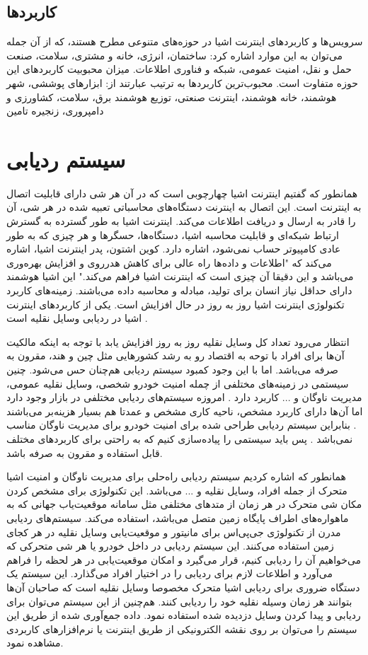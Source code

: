 \subsection{کاربردها}
سرویس‌ها و کاربردهای اینترنت اشیا در حوزه‌های متنوعی مطرح هستند، که از آن جمله می‌توان به این موارد اشاره کرد: ساختمان، انرژی، خانه و مشتری، سلامت، صنعت حمل و نقل، امنیت عمومی، شبكه و فناوری اطلاعات. میزان محبوبیت کاربردهای این حوزه متفاوت است. محبوب‌ترین کاربردها به ترتیب عبارتند از: ابزارهای پوششی، شهر هوشمند، خانه هوشمند، اینترنت صنعتی، توزیع هوشمند برق، سلامت، کشاورزی و دامپروری، زنجیره تامین
\section{سیستم ردیابی}
همانطور که گفتیم اینترنت اشیا چهارچوبی است که در آن هر شی دارای قابلیت اتصال به اینترنت است.
	این اتصال به اینترنت دستگاه‌های محاسباتی تعبیه شده در هر شی، آن را قادر به ارسال و دریافت اطلاعات می‌کند. اینترنت اشیا به طور گسترده به گسترش ارتباط شبکه‌ای و قابلیت محاسبه اشیا، دستگاه‌ها، حسگرها و هر چیزی که به طور عادی کامپیوتر حساب نمی‌شود، اشاره دارد. کوین اشتون، پدر اینترنت اشیا، اشاره می‌کند که "اطلاعات و داده‌ها راه عالی برای کاهش هدرروی و افزایش بهره‌وری می‌باشد و این دقیقا آن چیزی است که اینترنت اشیا فراهم می‌کند." این اشیا هوشمند دارای حداقل نیاز انسان برای تولید، مبادله و محاسبه داده می‌باشند. زمینه‌های کاربرد تکنولوژی اینترنت اشیا روز به روز در حال افزایش است. یکی از کاربردهای اینترنت اشیا در ردیابی وسایل نقلیه است \cite{Mangla2017, Mukhtar2015}.
	
انتظار می‌رود تعداد کل وسایل نقلیه روز به روز افزایش یابد با توجه به اینکه مالکیت آن‌ها برای افراد با توحه به اقتصاد رو به رشد کشورهایی مثل چین و هند، مقرون به صرفه می‌باشد. اما با این وجود کمبود سیستم ردیابی هم‌چنان حس می‌شود. چنین سیستمی در زمینه‌های مختلفی از چمله امنیت خودرو شخصی، وسایل نقلیه عمومی، مدیریت ناوگان و ... کاربرد دارد \cite{Pham2013}. امروزه سیستم‌های ردیابی مختلفی در بازار وجود دارد اما آن‌ها دارای کاربرد مشخص، ناحیه کاری مشخص و عمدتا هم بسیار هزینه‌بر می‌باشند \cite{YoujingCui2003}. بنابراین سیستم ردیابی طراحی شده برای امنیت خودرو برای مدیریت ناوگان مناسب نمی‌باشد \cite{Song2008}. پس باید سیستمی را پیاده‌سازی کنیم که به راحتی برای کاربردهای مختلف قابل استفاده و مقرون به صرفه باشد.


همانطور که اشاره کردیم سیستم ردیابی راه‌حلی برای مدیریت ناوگان و امنیت اشیا متحرک از جمله افراد، وسایل نقلیه و ... می‌باشد. این تکنولوژی برای مشخص کردن مکان شی متحرک در هر زمان از متدهای مختلفی مثل سامانه موقعیت‌یاب جهانی  که به ماهواره‌های اطراف پایگاه زمین متصل می‌باشد، استفاده می‌کند. سیستم‌های ردیابی مدرن از تکنولوژی جی‌پی‌اس برای مانیتور و موقعیت‌یابی وسایل نقلیه در هر کجای زمین استفاده می‌کنند. این سیستم ردیابی در داخل خودرو یا هر شی متحرکی که می‌خواهیم آن را ردیابی کنیم، قرار می‌گیرد و امکان موقعیت‌یابی در هر لحظه را فراهم می‌آورد  و اطلاعات لازم برای ردیابی را در اختیار افراد می‌گذارد. این سیستم یک دستگاه ضروری برای ردیابی اشیا متحرک مخصوصا وسایل نقلیه است که صاحبان آن‌ها بتوانند هر زمان وسیله نقلیه خود را ردیابی کنند. هم‌چنین از این سیستم می‌توان برای ردیابی و پیدا کردن وسایل دزدیده شده استفاده نمود. داده جمع‌آوری شده از طریق این سیستم را می‌توان بر روی نقشه الکترونیکی از طریق اینترنت یا نرم‌افزارهای کاربردی مشاهده نمود.


